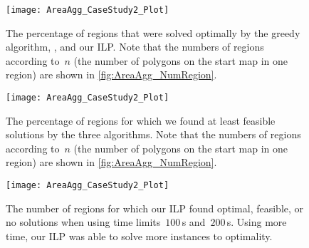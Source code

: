 \documentclass[acmsmall,natbib=false]{acmart}
\begin{document}
\begin{figure}[tb]
\centering
\texttt{[image: AreaAgg\_CaseStudy2\_Plot]}
\caption{The percentage of regions that were solved 
	optimally by the greedy algorithm, \Astar, and our ILP.
	Note that the numbers of regions according to~$n$ 
	(the number of polygons on the start map in one region) 
	are shown in \fig\ref{fig:AreaAgg_NumRegion}.}
\label{fig:AreaAgg_CaseStudy2_Percentage_Optimal}
%
\par\vspace{\baselineskip} %
%
\centering
\texttt{[image: AreaAgg\_CaseStudy2\_Plot]}
\caption{The percentage of regions for which we found at 
	least feasible solutions by the three algorithms.
	Note that the numbers of regions according to~$n$ 
	(the number of polygons on the start map in one region) 
	are shown in \fig\ref{fig:AreaAgg_NumRegion}.}
\label{fig:AreaAgg_CaseStudy2_Percentage_Feasible}
\end{figure}

\begin{figure}[tb]
\centering
\texttt{[image: AreaAgg\_CaseStudy2\_Plot]}
\caption{The number of regions for which
	our ILP found optimal, feasible, or no solutions 
	when using time limits~$100\,$s and~$200\,$s.
	Using more time, our ILP was able to 
	solve more instances to optimality.}
\label{fig:AreaAgg_CaseStudy2_ILP}
\end{figure}
\end{document}
